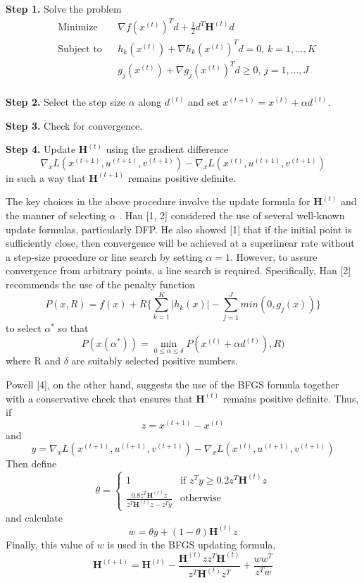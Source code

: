 \documentclass{article}
\begin{document}
\textbf{Step 1. }Solve the problem
\begin{equation*}
    \begin{aligned}
        & \text{Minimize}
        & & \nabla f(x^{(t)})^Td + \frac{1}{2}d^T\textbf{H}^{(t)}d \\
        & \text{Subject to}
        & & h_k(x^{(t)}) + \nabla h_k(x^{(t)})^Td = 0, \, k = 1, \ldots, K\\
        &&& g_j(x^{(t)}) + \nabla g_j(x^{(t)})^Td \geq 0, \, j = 1, \ldots, J\\
    \end{aligned}
\end{equation*}

\textbf{Step 2. }Select the step size $\alpha$ along $d^{(t)}$ and set $x^{(t+1)} = x^{(t)} + \alpha d^{(t)}$.

\textbf{Step 3. }Check for convergence.

\textbf{Step 4. }Update $\textbf{H}^{(t)}$ using the gradient difference
\[\nabla_xL(x^{(t+1)}, u^{(t+1)}, v^{(t+1)}) - \nabla_xL(x^{(t)}, u^{(t+1)}, v^{(t+1)})\]
in such a way that $\textbf{H}^{(t+1)}$ remains positive definite.\newline

The key choices in the above procedure involve the update formula for $\textbf{H}^{(t)}$ and the manner of selecting $\alpha$ . Han [1, 2] considered the use of several well-known update formulas, particularly DFP. He also showed [1] that if the initial point is sufficiently close, then convergence will be achieved at a superlinear rate without a step-size procedure or line search by setting $\alpha = 1$. However, to assure convergence from arbitrary points, a line search is required. Specifically, Han [2] recommends the use of the penalty function
\[P(x, R) = f(x) + R\{\sum_{k=1}^{K} |h_k(x)| - \sum_{j=1}^{J} min(0,g_j(x))\}\]
to select $\alpha^*$ so that
\[P(x(\alpha^*)) = \min_{0\leq\alpha\leq\delta} P(x^{(t)} + \alpha d^{(t)}), R)\]
where R and $\delta$ are suitably selected positive numbers.\par
Powell [4], on the other hand, suggests the use of the BFGS formula together with a conservative check that ensures that $\textbf{H}^{(t)}$ remains positive definite. Thus, if
\[z = x^{(t+1)} - x^{(t)}\]
and
\[y = \nabla_xL(x^{(t+1)}, u^{(t+1)}, v^{(t+1)}) - \nabla_xL(x^{(t)}, u^{(t+1)}, v^{(t+1)})\]
Then define
\[
    \theta =
    \begin{cases}
        1 & \text{if $z^Ty \geq 0.2z^T\textbf{H}^{(t)}z$}\\
        \frac{0.8z^T\textbf{H}^{(t)}z}{z^T\textbf{H}^{(t)}z - z^Ty} & \text{otherwise}
    \end{cases}
\]
and calculate
\[w = \theta y + (1-\theta) \textbf{H}^{(t)}z\]
Finally, this value of $w$ is used in the BFGS updating formula,
\[\textbf{H}^{(t+1)} = \textbf{H}^{(t)}-\frac{\textbf{H}^{(t)}zz^T\textbf{H}^{(t)}}{z^T\textbf{H}^{(t)}z^T}+\frac{ww^T}{z^Tw} \]
\end{document}
